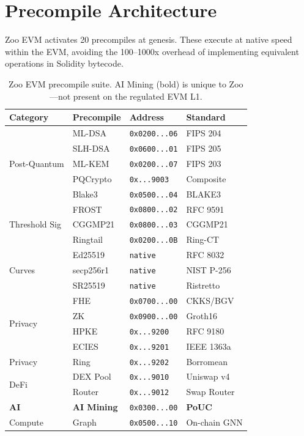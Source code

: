 \section{Precompile Architecture}


Zoo EVM activates 20 precompiles at genesis. These execute at native speed within the EVM, avoiding the 100--1000x overhead of implementing equivalent operations in Solidity bytecode.

\begin{table}[h]
\centering
\small
\begin{tabular}{llll}
\toprule
\textbf{Category} & \textbf{Precompile} & \textbf{Address} & \textbf{Standard} \\
\midrule
\multirow{5}{*}{Post-Quantum} & ML-DSA & \texttt{0x0200...06} & FIPS 204 \\
 & SLH-DSA & \texttt{0x0600...01} & FIPS 205 \\
 & ML-KEM & \texttt{0x0200...07} & FIPS 203 \\
 & PQCrypto & \texttt{0x...9003} & Composite \\
 & Blake3 & \texttt{0x0500...04} & BLAKE3 \\
\midrule
\multirow{3}{*}{Threshold Sig} & FROST & \texttt{0x0800...02} & RFC 9591 \\
 & CGGMP21 & \texttt{0x0800...03} & CGGMP21 \\
 & Ringtail & \texttt{0x0200...0B} & Ring-CT \\
\midrule
\multirow{3}{*}{Curves} & Ed25519 & \texttt{native} & RFC 8032 \\
 & secp256r1 & \texttt{native} & NIST P-256 \\
 & SR25519 & \texttt{native} & Ristretto \\
\midrule
\multirow{4}{*}{Privacy} & FHE & \texttt{0x0700...00} & CKKS/BGV \\
 & ZK & \texttt{0x0900...00} & Groth16 \\
 & HPKE & \texttt{0x...9200} & RFC 9180 \\
 & ECIES & \texttt{0x...9201} & IEEE 1363a \\
\midrule
Privacy & Ring & \texttt{0x...9202} & Borromean \\
\midrule
\multirow{2}{*}{DeFi} & DEX Pool & \texttt{0x...9010} & Uniswap v4 \\
 & Router & \texttt{0x...9012} & Swap Router \\
\midrule
\textbf{AI} & \textbf{AI Mining} & \texttt{0x0300...00} & \textbf{PoUC} \\
\midrule
Compute & Graph & \texttt{0x0500...10} & On-chain GNN \\
\bottomrule
\end{tabular}
\caption{Zoo EVM precompile suite. AI Mining (bold) is unique to Zoo---not present on the regulated EVM L1.}
\end{table}

